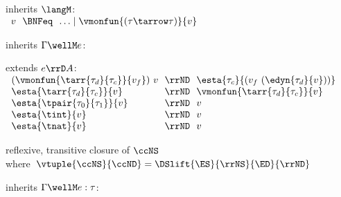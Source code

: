 \begin{flushleft}

\begin{minipage}[t]{\columnwidth}
 inherits $\langM$:\\
$\begin{array}{l@{~~}c@{~~}l}
  v & \BNFeq & \ldots \mid \vmonfun{(\tau\tarrow\tau)}{v}
\end{array}$

\medskip
{} inherits $\Gamma \wellM e$:\\
\begin{mathpar}
\end{mathpar}

\medskip
{} extends $e \rrD A$:\\
$\begin{array}{l@{~~}c@{~~}l}
  (\vmonfun{\tarr{\tau_d}{\tau_c}}{v_f})~v & \rrND & \esta{\tau_c}{(v_f~(\edyn{\tau_d}{v}))}
\\
  \esta{\tarr{\tau_d}{\tau_c}}{v} & \rrND & \vmonfun{\tarr{\tau_d}{\tau_c}}{v}
\\
  \esta{\tpair{\tau_0}{\tau_1}}{v} & \rrND & v
\\
  \esta{\tint}{v} & \rrND & v
\\
  \esta{\tnat}{v} & \rrND & v
\end{array}$

\medskip
{} reflexive, transitive closure of $\ccNS$\\
\mbox{\quad where $\vtuple{\ccNS}{\ccND} = \DSlift{\ES}{\rrNS}{\ED}{\rrND}$}
\smallskip
\end{minipage}\hspace{\columnsep}%
\begin{minipage}[t]{\columnwidth}
 inherits $\Gamma \wellM e : \tau$:
\begin{mathpar}
\end{mathpar}


\end{minipage}
\end{flushleft}
